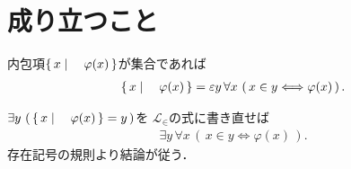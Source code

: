 \section{成り立つこと}
	\begin{screen}
		\begin{thm}
			内包項$\left\{\, x \mid \quad \varphi(x)\, \right\}$が集合であれば
			\begin{align}
				\left\{\, x \mid \quad \varphi(x)\, \right\} = \varepsilon y\, \forall x\,
				\left(\, x \in y \Longleftrightarrow \varphi(x)\, \right).
			\end{align}
		\end{thm}
	\end{screen}
	
	\begin{sketch}
		$\exists y\, \left(\, \left\{\, x \mid \quad \varphi(x)\, \right\} = y\, \right)$を
		$\mathcal{L}_{\in}$の式に書き直せば
		\begin{align}
			\exists y\, \forall x\, \left(\, x \in y \Longleftrightarrow \varphi(x)\, \right).
		\end{align}
		存在記号の規則より結論が従う．
		\QED
	\end{sketch}